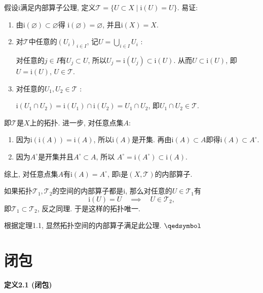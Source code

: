 假设$\mathrm{i}$满足内部算子公理,
定义$\mathcal{T}=\{U\subset X\mid\mathrm{i}(U)=U\}$. 易证:
\begin{enumerate}
    \item 由$\mathrm{i}(\varnothing)\subset\varnothing$得
    $\mathrm{i}(\varnothing)=\varnothing$, 并且$\mathrm{i}(X)=X$.
    \item 对$\mathcal{T}$中任意的$(U_i)_{i\in I}$,
    记$\displaystyle U=\bigcup_{i\in I}U_i$ :
    
    \vspace{3pt}\hspace{2.17em}
    对任意的$j\in I$有$U_j\subset U$, 所以$U_j=\mathrm{i}(U_j)\subset\mathrm{i}(U)$.
    从而$U\subset\mathrm{i}(U)$, 即$U=\mathrm{i}(U)$, $U\in\mathcal{T}$.
    \item 对任意的$U_1,U_2\in\mathcal{T}$ :
    
    \hspace{2.17em}
    $\mathrm{i}(U_1\cap U_2)=\mathrm{i}(U_1)\cap\mathrm{i}(U_2)=U_1\cap U_2$,
    即$U_1\cap U_2\in\mathcal{T}$.
\end{enumerate}
即$\mathcal{T}$是$X$上的拓扑. 进一步, 对任意点集$A$:
\begin{enumerate}
    \item 因为$\mathrm{i}(\mathrm{i}(A))=\mathrm{i}(A)$, 所以$\mathrm{i}(A)$是开集.
    再由$\mathrm{i}(A)\subset A$即得$\mathrm{i}(A)\subset A^\circ$.
    \item 因为$A^\circ$是开集并且$A^\circ\subset A$, 所以
    $A^\circ=\mathrm{i}(A^\circ)\subset\mathrm{i}(A)$.
\end{enumerate}
综上, 对任意点集$A$有$\mathrm{i}(A)=A^\circ$,
即$\mathrm{i}$是$(X,\mathcal{T})$的内部算子.

如果拓扑$\mathcal{T}_1,\mathcal{T}_2$的空间的内部算子都是$\mathrm{i}$,
那么对任意的$U\in\mathcal{T}_1$有
\[
    \mathrm{i}(U)=U\quad\implies\quad U\in\mathcal{T}_2,
\]
即$\mathcal{T}_1\subset\mathcal{T}_2$, 反之同理. 于是这样的拓扑唯一.


根据定理1.1, 显然拓扑空间的内部算子满足此公理. \hfill $\qedsymbol$





\newpage

\section{闭包}

\hypertarget{sec:定义2.1}{}
\noindent\textbf{定义2.1 (闭包)}

